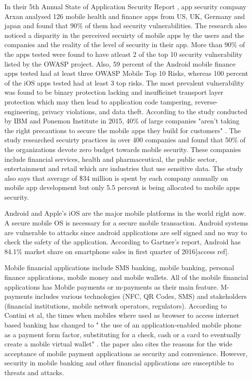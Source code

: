\documentclass{mproj}
\begin{document}
In their 5th Annual State of Application Security Report \cite{arxan}, app security company Arxan analysed 126 mobile health and finance apps from US, UK, Germany and japan and found that 90\% of them had security vulnerabilities. The research also noticed a disparity in the perceived secuirty of mobile apps by the users and the companies and the reality of the level of security in their app. More than 90\% of the apps tested were found to have atleast 2 of the top 10 security vulnerability listed by the OWASP project. Also,  59 percent of the Android mobile finance apps tested had at least three OWASP Mobile Top 10 Risks, whereas 100 percent of the iOS apps tested had at least 3 top risks. The most prevalent vulnerability was found to be binary protection lacking and insufficinet transport layer protection which may then lead to application code tampering, reverse-engineering, privacy violations, and data theft. According to the study conducted by IBM and Ponemon Institute in 2015, 40\% of large companies "aren’t taking the right precautions to secure the mobile apps they build for customers" \cite{ibm}. The study researched secuirty practices in over 400 companies and found that 50\% of the organizations devote zero budget towards mobile security. These companies include financial services, health and pharmaceutical, the public sector, entertainment and retail which are industries that use sensitive data. The study also says that average of \$34 million is spent by each company annually on mobile app development but only 5.5 percent is being allocated to mobile apps security.  

Android and Apple's iOS are the major mobile platforms in the world right now. A secure mobile OS is necessary for a secure mobile transaction. Android systems are vulnerable to attacks since android applications are self signed and no way to check the safety of the application. 
According to Gartner's report, Android has 84.1\% market share on smartphone sales in first quarter of 2016[access ref].

Mobile financial applications include SMS banking, mobile banking, personal finance applications, mobile money and mobile wallets. All of the mobile financial applications has Mobile payments or m-payments as their main feature. M-payments includes various technologies (NFC, QR Codes, SMS) and stakeholders (financial institutions, mobile network operators, regulators). According to Contini et al\cite{contini2011}, the times when mobiles where used as browser to access internet based banking has changed to " the use of an application-enabled mobile phone as a payment form factor, substituting for a check, cash or a card to eventually create a mobile virtual wallet" \cite{contini2011}. the paper also cites the reasons for the wide acceptance of mobile payment applications as security and convenience. However, security in mobile banking and other financial applications are susceptible to threats and attacks.
\end{document}
